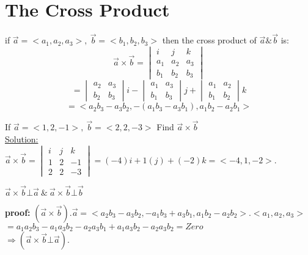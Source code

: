 \section{The Cross Product}
\begin{definition}
if $\overrightarrow{a}=<a_1,a_2,a_3>,~\overrightarrow{b}=<b_1,b_2,b_3>$ then the cross product of $\overrightarrow{a}\&\overrightarrow{b}$ is:
$$\overrightarrow{a}\times\overrightarrow{b}=\begin{vmatrix}
i&j&k\\
a_1&a_2&a_3\\
b_1&b_2&b_3
\end{vmatrix}$$
$$=\begin{vmatrix}
a_2&a_3\\
b_2&b_3
\end{vmatrix}i-
\begin{vmatrix}
a_1&a_3\\
b_1&b_3
\end{vmatrix}j+
\begin{vmatrix}
a_1&a_2\\
b_1&b_2
\end{vmatrix}k$$
$$=<a_2b_3-a_3b_2,-(a_1b_3-a_3b_1),a_1b_2-a_2b_1>$$
\end{definition} 
\begin{example}
If $\overrightarrow{a}=<1,2,-1>,~\overrightarrow{b}=<2,2,-3>$ Find $\overrightarrow{a}\times\overrightarrow{b}$\\
{\color{smalt(darkpowderblue)}\underline{Solution:}}\\
$\overrightarrow{a}\times\overrightarrow{b}=\begin{vmatrix}
i&j&k\\
1&2&-1\\
2&2&-3
\end{vmatrix}=(-4)i+1(j)+(-2)k=<-4,1,-2>.$
\end{example}
\begin{theorem}
$\overrightarrow{a}\times\overrightarrow{b}\bot\overrightarrow{a}~\&~\overrightarrow{a}\times\overrightarrow{b}\bot\overrightarrow{b}$\\
\end{theorem}
{\color{smalt(darkpowderblue)}\textbf{proof:}}
$(\overrightarrow{a}\times\overrightarrow{b}).\overrightarrow{a}=<a_2b_3-a_3b_2,-a_1b_3+a_3b_1,a_1b_2-a_2b_2>.<a_1,a_2,a_3>$\\
$=a_1a_2b_3-a_1a_3b_2-a_2a_3b_1+a_1a_3b_2-a_2a_3b_2=Zero$\\
$\Rightarrow(\overrightarrow{a}\times\overrightarrow{b}\bot\overrightarrow{a}).$
